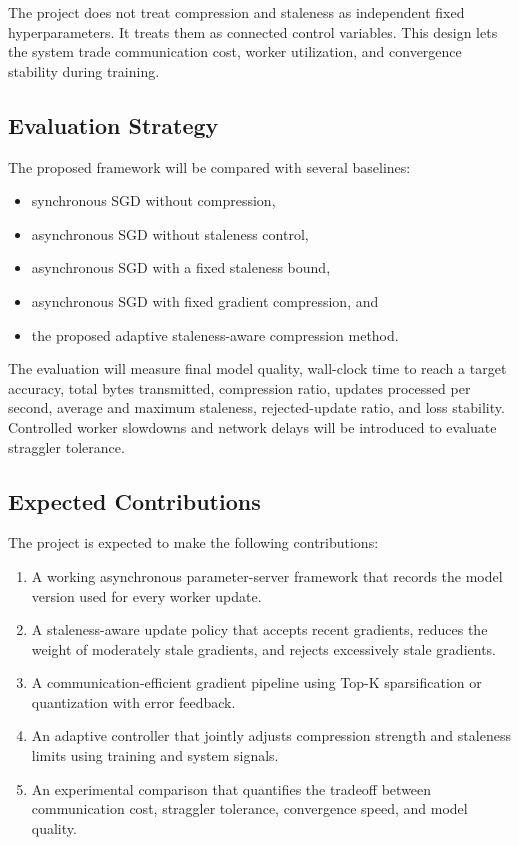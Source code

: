 \documentclass[conference]{IEEEtran}
\begin{document}
The project does not treat compression and staleness as independent fixed hyperparameters. It treats them as connected control variables. This design lets the system trade communication cost, worker utilization, and convergence stability during training.

\subsection{Evaluation Strategy}

The proposed framework will be compared with several baselines:
\begin{itemize}
    \item synchronous SGD without compression,
    \item asynchronous SGD without staleness control,
    \item asynchronous SGD with a fixed staleness bound,
    \item asynchronous SGD with fixed gradient compression, and
    \item the proposed adaptive staleness-aware compression method.
\end{itemize}

The evaluation will measure final model quality, wall-clock time to reach a target accuracy, total bytes transmitted, compression ratio, updates processed per second, average and maximum staleness, rejected-update ratio, and loss stability. Controlled worker slowdowns and network delays will be introduced to evaluate straggler tolerance.

\subsection{Expected Contributions}

The project is expected to make the following contributions:
\begin{enumerate}
    \item A working asynchronous parameter-server framework that records the model version used for every worker update.
    \item A staleness-aware update policy that accepts recent gradients, reduces the weight of moderately stale gradients, and rejects excessively stale gradients.
    \item A communication-efficient gradient pipeline using Top-K sparsification or quantization with error feedback.
    \item An adaptive controller that jointly adjusts compression strength and staleness limits using training and system signals.
    \item An experimental comparison that quantifies the tradeoff between communication cost, straggler tolerance, convergence speed, and model quality.
\end{enumerate}
\end{document}
